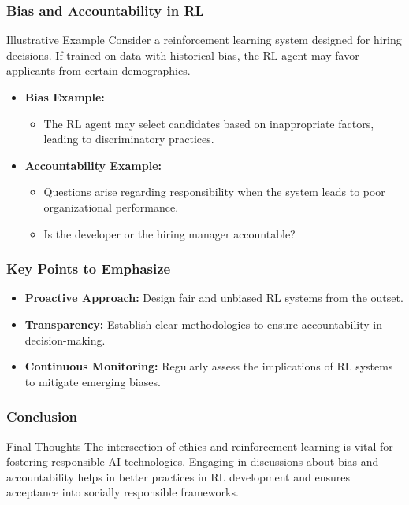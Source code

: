 \documentclass{beamer}
\begin{document}
\begin{frame}[fragile]
    \frametitle{Bias and Accountability in RL}
    \begin{block}{Illustrative Example}
        Consider a reinforcement learning system designed for hiring decisions. If trained on data with historical bias, the RL agent may favor applicants from certain demographics.
    \end{block}
    
    \begin{itemize}
        \item \textbf{Bias Example:} 
        \begin{itemize}
            \item The RL agent may select candidates based on inappropriate factors, leading to discriminatory practices.
        \end{itemize}
        
        \item \textbf{Accountability Example:} 
        \begin{itemize}
            \item Questions arise regarding responsibility when the system leads to poor organizational performance.
            \item Is the developer or the hiring manager accountable?
        \end{itemize}
    \end{itemize}
\end{frame}

\begin{frame}[fragile]
    \frametitle{Key Points to Emphasize}
    \begin{itemize}
        \item \textbf{Proactive Approach:} Design fair and unbiased RL systems from the outset.
        \item \textbf{Transparency:} Establish clear methodologies to ensure accountability in decision-making.
        \item \textbf{Continuous Monitoring:} Regularly assess the implications of RL systems to mitigate emerging biases.
    \end{itemize}
\end{frame}

\begin{frame}[fragile]
    \frametitle{Conclusion}
    \begin{block}{Final Thoughts}
        The intersection of ethics and reinforcement learning is vital for fostering responsible AI technologies. Engaging in discussions about bias and accountability helps in better practices in RL development and ensures acceptance into socially responsible frameworks.
    \end{block}
\end{frame}
\end{document}
